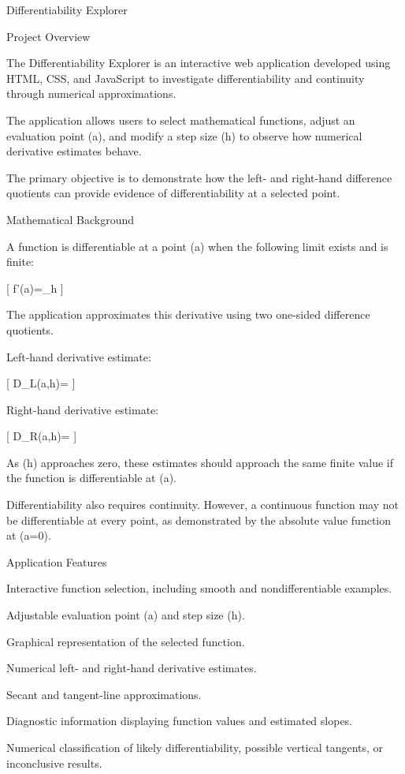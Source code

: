 
Differentiability Explorer

Project Overview

The Differentiability Explorer is an interactive web application developed using HTML, CSS, and JavaScript to investigate differentiability and continuity through numerical approximations.

The application allows users to select mathematical functions, adjust an evaluation point (a), and modify a step size (h) to observe how numerical derivative estimates behave.

The primary objective is to demonstrate how the left- and right-hand difference quotients can provide evidence of differentiability at a selected point.

Mathematical Background

A function is differentiable at a point (a) when the following limit exists and is finite:

[
f'(a)=\lim_{h}
]

The application approximates this derivative using two one-sided difference quotients.

Left-hand derivative estimate:

[
D_L(a,h)=
]

Right-hand derivative estimate:

[
D_R(a,h)=
]

As (h) approaches zero, these estimates should approach the same finite value if the function is differentiable at (a).

Differentiability also requires continuity. However, a continuous function may not be differentiable at every point, as demonstrated by the absolute value function at (a=0).

Application Features

Interactive function selection, including smooth and nondifferentiable examples.

Adjustable evaluation point (a) and step size (h).

Graphical representation of the selected function.

Numerical left- and right-hand derivative estimates.

Secant and tangent-line approximations.

Diagnostic information displaying function values and estimated slopes.

Numerical classification of likely differentiability, possible vertical tangents, or inconclusive results.


